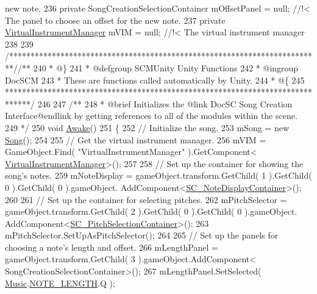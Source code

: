 \begin{DoxyCodeInclude}
{       new note.}
236 \textcolor{comment}{}    \textcolor{keyword}{private} SongCreationSelectionContainer mOffsetPanel = null; \textcolor{comment}{//!< The panel to choose an offset for the
       new note.}
237 \textcolor{comment}{}    \textcolor{keyword}{private} \hyperlink{class_virtual_instrument_manager}{VirtualInstrumentManager} mVIM = null; \textcolor{comment}{//!< The virtual instrument
       manager}
238 \textcolor{comment}{}
239     \textcolor{comment}{/*************************************************************************/}\textcolor{comment}{/** }
240 \textcolor{comment}{    * @\}}
241 \textcolor{comment}{    * @defgroup SCMUnity Unity Functions}
242 \textcolor{comment}{    * @ingroup DocSCM}
243 \textcolor{comment}{    * These are functions called automatically by Unity.}
244 \textcolor{comment}{    * @\{}
245 \textcolor{comment}{    ******************************************************************************/}
246 \textcolor{comment}{}
247 \textcolor{comment}{    /**}
248 \textcolor{comment}{     * @brief Initializes the @link DocSC Song Creation Interface@endlink by getting references to all of
       the modules within the scene.}
249 \textcolor{comment}{    */}
250     \textcolor{keywordtype}{void} \hyperlink{group___s_c_m_nest_class_ae7264acac3310f5db50df38467734c06}{Awake}()
251     \{
252         \textcolor{comment}{// Initialize the song.}
253         mSong = \textcolor{keyword}{new} \hyperlink{class_song}{Song}();
254 
255         \textcolor{comment}{// Get the virtual instrument manager.}
256         mVIM = GameObject.Find( \textcolor{stringliteral}{"VirtualInstrumentManager"} ).GetComponent<
      \hyperlink{class_virtual_instrument_manager}{VirtualInstrumentManager}>();
257 
258         \textcolor{comment}{// Set up the container for showing the song's notes.}
259         mNoteDisplay = gameObject.transform.GetChild( 1 ).GetChild( 0 ).GetChild( 0 ).gameObject.
      AddComponent<\hyperlink{class_s_c___note_display_container}{SC\_NoteDisplayContainer}>();
260 
261         \textcolor{comment}{// Set up the container for selecting pitches.}
262         mPitchSelector = gameObject.transform.GetChild( 2 ).GetChild( 0 ).GetChild( 0 ).gameObject.
      AddComponent<\hyperlink{class_s_c___pitch_selection_container}{SC\_PitchSelectionContainer}>();
263         mPitchSelector.SetUpAsPitchSelector();
264 
265         \textcolor{comment}{// Set up the panels for choosing a note's length and offset.}
266         mLengthPanel = gameObject.transform.GetChild( 3 ).gameObject.AddComponent<
      SongCreationSelectionContainer>();
267         mLengthPanel.SetSelected( \hyperlink{class_music}{Music}.\hyperlink{group___music_enums_gaf11b5f079adbb21c800b9eca1c5c3cbd}{NOTE\_LENGTH}.Q );

\end{DoxyCodeInclude}
